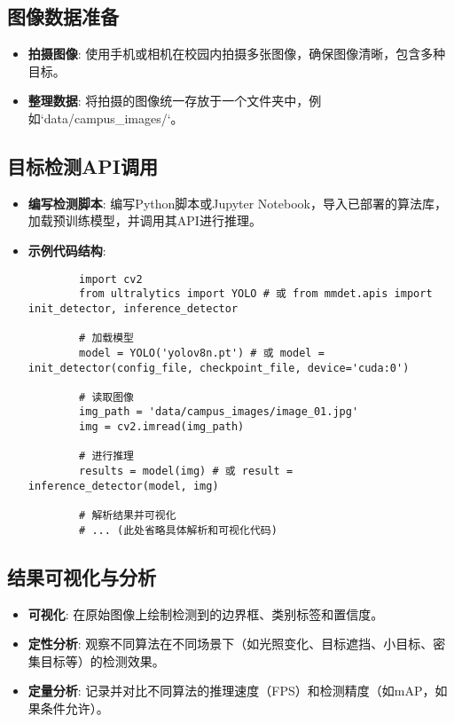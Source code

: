 \subsection{图像数据准备}
\begin{itemize}
    \item \textbf{拍摄图像}: 使用手机或相机在校园内拍摄多张图像，确保图像清晰，包含多种目标。
    \item \textbf{整理数据}: 将拍摄的图像统一存放于一个文件夹中，例如`data/campus_images/`。
\end{itemize}

\subsection{目标检测API调用}
\begin{itemize}
    \item \textbf{编写检测脚本}: 编写Python脚本或Jupyter Notebook，导入已部署的算法库，加载预训练模型，并调用其API进行推理。
    \item \textbf{示例代码结构}:
    \begin{verbatim}
        import cv2
        from ultralytics import YOLO # 或 from mmdet.apis import init_detector, inference_detector

        # 加载模型
        model = YOLO('yolov8n.pt') # 或 model = init_detector(config_file, checkpoint_file, device='cuda:0')

        # 读取图像
        img_path = 'data/campus_images/image_01.jpg'
        img = cv2.imread(img_path)

        # 进行推理
        results = model(img) # 或 result = inference_detector(model, img)

        # 解析结果并可视化
        # ... (此处省略具体解析和可视化代码)
    \end{verbatim}
\end{itemize}

\subsection{结果可视化与分析}
\begin{itemize}
    \item \textbf{可视化}: 在原始图像上绘制检测到的边界框、类别标签和置信度。
    \item \textbf{定性分析}: 观察不同算法在不同场景下（如光照变化、目标遮挡、小目标、密集目标等）的检测效果。
    \item \textbf{定量分析}: 记录并对比不同算法的推理速度（FPS）和检测精度（如mAP，如果条件允许）。
\end{itemize}
